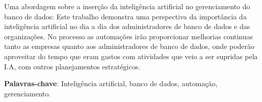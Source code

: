 \documentclass[
	12pt,
	openright,		
	twoside,
	a4paper,
	english,
	brazil,
	]{abntex2}
\begin{document}
\frenchspacing 				%

\pretextual

\imprimircapa
\imprimirfolhaderosto

\setlength{\absparsep}{18pt} %
\begin{resumo}

Uma abordagem sobre a inserção da inteligência artificial no gerenciamento do banco de dados: Este trabalho demonstra uma perspectiva da importância da inteligência artificial no dia a dia dos administradores de banco de dados e das organizações. No processo as automações irão proporcionar melhorias continuas tanto as empresas quanto aos administradores de banco de dados, onde poderão aproveitar do tempo que eram gastos com atividades que veio a ser supridas pela I.A, com outros planejamentos estratégicos.

\textbf{Palavras-chave}: Inteligência artificial, banco de dados, automação, gerenciamento.

\end{resumo}


\tableofcontents*
\cleardoublepage

\textual






\postextual

\end{document}
